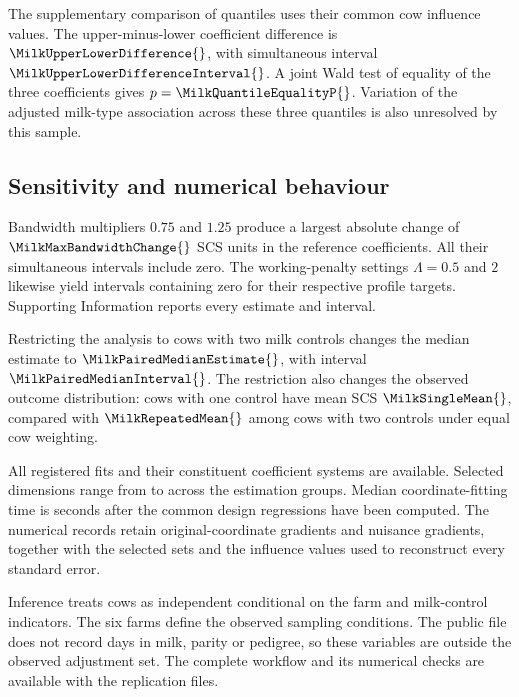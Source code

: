 The supplementary comparison of quantiles uses their common cow
influence values. The upper-minus-lower coefficient difference is
$\MilkUpperLowerDifference{}$, with simultaneous interval
$\MilkUpperLowerDifferenceInterval{}$. A joint Wald test of equality
of the three coefficients gives $p=\MilkQuantileEqualityP{}$.
Variation of the adjusted milk-type association across these three
quantiles is also unresolved by this sample.

\subsection{Sensitivity and numerical behaviour}

Bandwidth multipliers $0.75$ and $1.25$ produce a largest absolute
change of $\MilkMaxBandwidthChange{}$ SCS units in the reference
coefficients. All their simultaneous intervals include zero. The
working-penalty settings $\Lambda=0.5$ and $2$ likewise yield intervals
containing zero for their respective profile targets. Supporting
Information reports every estimate and interval.

Restricting the analysis to cows with two milk controls changes the
median estimate to $\MilkPairedMedianEstimate{}$, with interval
$\MilkPairedMedianInterval{}$. The restriction also changes the
observed outcome distribution: cows with one control have mean SCS
$\MilkSingleMean{}$, compared with $\MilkRepeatedMean{}$ among cows
with two controls under equal cow weighting.

All \MilkFits{} registered fits and their \MilkSystems{} constituent
coefficient systems are available. Selected dimensions range from
\MilkMinSelected{} to \MilkMaxSelected{} across the estimation
groups. Median coordinate-fitting time is \MilkMedianRuntime{}
seconds after the common design regressions have been computed.
The numerical records retain original-coordinate gradients and
nuisance gradients, together with the selected sets and the influence
values used to reconstruct every standard error.

Inference treats cows as independent conditional on the farm and
milk-control indicators. The six farms define the observed sampling
conditions. The public file does not record days in milk, parity or
pedigree, so these variables are outside the observed adjustment set.
The complete workflow and its numerical checks are available with
the replication files.
